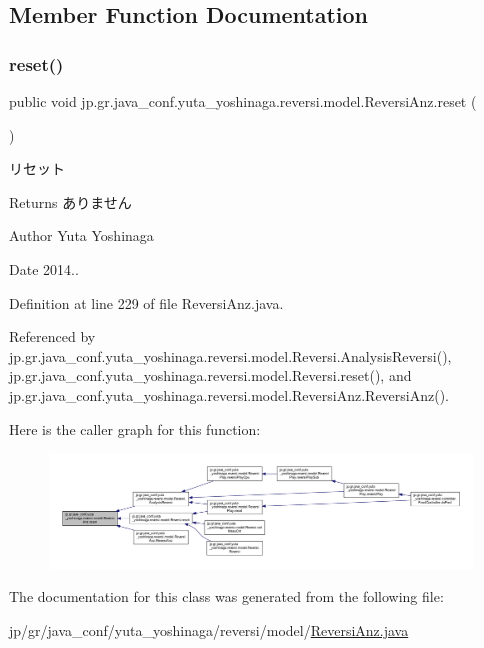 \subsection{Member Function Documentation}
\mbox{\label{classjp_1_1gr_1_1java__conf_1_1yuta__yoshinaga_1_1reversi_1_1model_1_1_reversi_anz_ab87a68776fedd66e0fa8bed2c24d461b}} 
\subsubsection{\texorpdfstring{reset()}{reset()}}
{\footnotesize\ttfamily public void jp.\+gr.\+java\+\_\+conf.\+yuta\+\_\+yoshinaga.\+reversi.\+model.\+Reversi\+Anz.\+reset (\begin{DoxyParamCaption}{ }\end{DoxyParamCaption})}



リセット 

\begin{DoxyReturn}{Returns}
ありません 
\end{DoxyReturn}
\begin{DoxyAuthor}{Author}
Yuta Yoshinaga 
\end{DoxyAuthor}
\begin{DoxyDate}{Date}
2014.. 
\end{DoxyDate}


Definition at line 229 of file Reversi\+Anz.\+java.



Referenced by jp.\+gr.\+java\+\_\+conf.\+yuta\+\_\+yoshinaga.\+reversi.\+model.\+Reversi.\+Analysis\+Reversi(), jp.\+gr.\+java\+\_\+conf.\+yuta\+\_\+yoshinaga.\+reversi.\+model.\+Reversi.\+reset(), and jp.\+gr.\+java\+\_\+conf.\+yuta\+\_\+yoshinaga.\+reversi.\+model.\+Reversi\+Anz.\+Reversi\+Anz().

Here is the caller graph for this function\+:\nopagebreak
\begin{figure}[H]
\begin{center}
\leavevmode
\includegraphics[width=350pt]{classjp_1_1gr_1_1java__conf_1_1yuta__yoshinaga_1_1reversi_1_1model_1_1_reversi_anz_ab87a68776fedd66e0fa8bed2c24d461b_icgraph}
\end{center}
\end{figure}


The documentation for this class was generated from the following file\+:\begin{DoxyCompactItemize}
\item 
jp/gr/java\+\_\+conf/yuta\+\_\+yoshinaga/reversi/model/\hyperlink{_reversi_anz_8java}{Reversi\+Anz.\+java}\end{DoxyCompactItemize}
